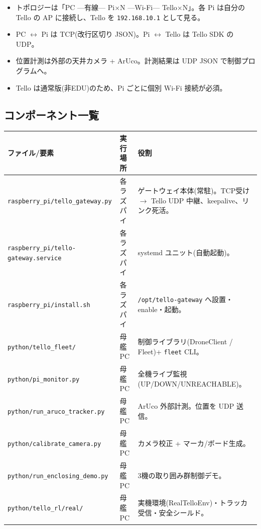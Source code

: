 \documentclass[11pt,a4paper]{ltjsarticle}
\newcommand{\code}[1]{\texttt{\small #1}}
\begin{document}
\begin{itemize}[leftmargin=1.4em]
  \item トポロジーは「PC ---有線--- Pi$\times$N ---Wi-Fi--- Tello$\times$N」。各 Pi は自分の
        Tello の AP に接続し、Tello を \code{192.168.10.1} として見る。
  \item PC $\leftrightarrow$ Pi は TCP(改行区切り JSON)。Pi $\leftrightarrow$ Tello は Tello SDK の UDP。
  \item 位置計測は外部の天井カメラ + ArUco。計測結果は UDP JSON で制御プログラムへ。
  \item Tello は通常版(非EDU)のため、Pi ごとに個別 Wi-Fi 接続が必須。
\end{itemize}

\subsection{コンポーネント一覧}
\begin{longtable}{@{}p{4.6cm}p{2.4cm}p{8.2cm}@{}}
\toprule
\textbf{ファイル/要素} & \textbf{実行場所} & \textbf{役割} \\
\midrule
\endhead
\code{raspberry\_pi/tello\_gateway.py} & 各ラズパイ & ゲートウェイ本体(常駐)。TCP受け $\to$ Tello UDP 中継、keepalive、リンク死活。\\
\code{raspberry\_pi/tello-gateway.service} & 各ラズパイ & systemd ユニット(自動起動)。\\
\code{raspberry\_pi/install.sh} & 各ラズパイ & \code{/opt/tello-gateway} へ設置・enable・起動。\\
\code{python/tello\_fleet/} & 母艦PC & 制御ライブラリ(DroneClient / Fleet)+ \code{fleet} CLI。\\
\code{python/pi\_monitor.py} & 母艦PC & 全機ライブ監視(UP/DOWN/UNREACHABLE)。\\
\code{python/run\_aruco\_tracker.py} & 母艦PC & ArUco 外部計測。位置を UDP 送信。\\
\code{python/calibrate\_camera.py} & 母艦PC & カメラ校正 + マーカ/ボード生成。\\
\code{python/run\_enclosing\_demo.py} & 母艦PC & 3機の取り囲み群制御デモ。\\
\code{python/tello\_rl/real/} & 母艦PC & 実機環境(RealTelloEnv)・トラッカ受信・安全シールド。\\
\bottomrule
\end{longtable}

\end{document}

